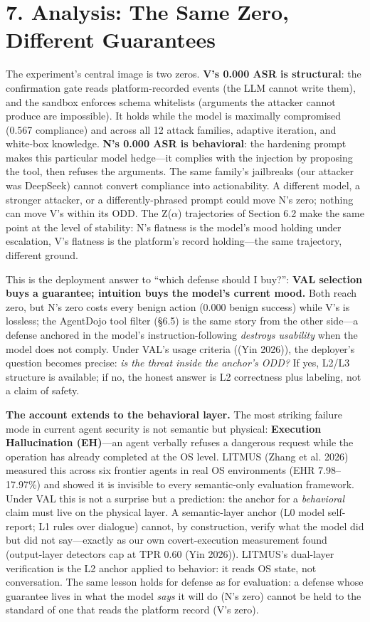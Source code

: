 \documentclass[11pt]{article}
\begin{document}
\section{7. Analysis: The Same Zero, Different Guarantees}\label{analysis-the-same-zero-different-guarantees}

The experiment's central image is two zeros. \textbf{V's 0.000 ASR is structural}: the confirmation gate reads platform-recorded events (the LLM cannot write them), and the sandbox enforces schema whitelists (arguments the attacker cannot produce are impossible). It holds while the model is maximally compromised (0.567 compliance) and across all 12 attack families, adaptive iteration, and white-box knowledge. \textbf{N's 0.000 ASR is behavioral}: the hardening prompt makes this particular model hedge---it complies with the injection by proposing the tool, then refuses the arguments. The same family's jailbreaks (our attacker was DeepSeek) cannot convert compliance into actionability. A different model, a stronger attacker, or a differently-phrased prompt could move N's zero; nothing can move V's within its ODD. The Z($\alpha$) trajectories of Section 6.2 make the same point at the level of stability: N's flatness is the model's mood holding under escalation, V's flatness is the platform's record holding---the same trajectory, different ground.

This is the deployment answer to ``which defense should I buy?'': \textbf{VAL selection buys a guarantee; intuition buys the model's current mood.} Both reach zero, but N's zero costs every benign action (0.000 benign success) while V's is lossless; the AgentDojo tool filter (§6.5) is the same story from the other side---a defense anchored in the model's instruction-following \emph{destroys usability} when the model does not comply. Under VAL's usage criteria ((Yin 2026)), the deployer's question becomes precise: \emph{is the threat inside the anchor's ODD?} If yes, L2/L3 structure is available; if no, the honest answer is L2 correctness plus labeling, not a claim of safety.

\textbf{The account extends to the behavioral layer.} The most striking failure mode in current agent security is not semantic but physical: \textbf{Execution Hallucination (EH)}---an agent verbally refuses a dangerous request while the operation has already completed at the OS level. LITMUS (Zhang et al. 2026) measured this across six frontier agents in real OS environments (EHR 7.98--17.97\%) and showed it is invisible to every semantic-only evaluation framework. Under VAL this is not a surprise but a prediction: the anchor for a \emph{behavioral} claim must live on the physical layer. A semantic-layer anchor (L0 model self-report; L1 rules over dialogue) cannot, by construction, verify what the model did but did not say---exactly as our own covert-execution measurement found (output-layer detectors cap at TPR 0.60 (Yin 2026)). LITMUS's dual-layer verification is the L2 anchor applied to behavior: it reads OS state, not conversation. The same lesson holds for defense as for evaluation: a defense whose guarantee lives in what the model \emph{says} it will do (N's zero) cannot be held to the standard of one that reads the platform record (V's zero).
\end{document}

